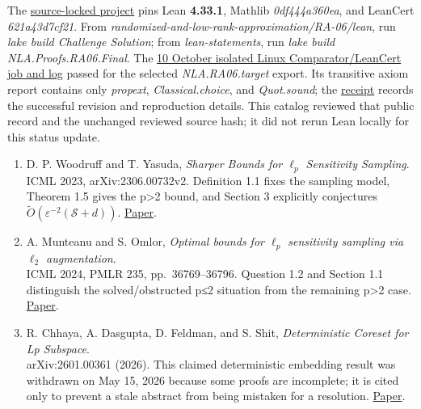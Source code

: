 \documentclass[11pt,a4paper]{article}
\makeatletter
\providecommand{\tightlist}{\setlength{\itemsep}{0pt}\setlength{\parskip}{0pt}}
\renewcommand{\subsection}{\Needspace{4\baselineskip}\@startsection{subsection}{2}{0pt}{9pt plus 1pt minus 1pt}{3pt}{\sffamily\bfseries\normalsize\color{ink}}}
\makeatother
\begin{document}
The
\href{https://github.com/ajt60gaibb/OpenProblemsInNLA/blob/main/randomized-and-low-rank-approximation/RA-06/lean/lake-manifest.json}{source-locked
project} pins Lean \textbf{4.33.1}, Mathlib \textit{0df444a360ea}, and
LeanCert \textit{621a43d7cf21}. From
\textit{randomized-and-low-rank-approximation/RA-06/lean}, run
\textit{lake build Challenge Solution}; from
\textit{lean-statements}, run
\textit{lake build NLA.Proofs.RA06.Final}. The
\href{https://github.com/ajt60gaibb/OpenProblemsInNLA/actions/runs/38006337671/job/114076127303}{10
October isolated Linux Comparator/LeanCert job and log} passed for the
selected \textit{NLA.RA06.target} export. Its transitive axiom report
contains only \textit{propext}, \textit{Classical.choice}, and
\textit{Quot.sound}; the
\href{https://github.com/ajt60gaibb/OpenProblemsInNLA/blob/main/docs/lean/proofs/RA-06/LINUX_CI_RECEIPT.md}{receipt}
records the successful revision and reproduction details. This catalog
reviewed that public record and the unchanged reviewed source hash; it
did not rerun Lean locally for this status update.

\newpage
\subsection{References}\label{references}

\begin{enumerate}
\def\labelenumi{\arabic{enumi}.}
\tightlist
\item
  D. P. Woodruff and T. Yasuda, \emph{Sharper Bounds for \(\ell_p\)
  Sensitivity Sampling}.\\
  ICML 2023, arXiv:2306.00732v2. Definition 1.1 fixes the sampling
  model, Theorem 1.5 gives the p\textgreater2 bound, and Section 3
  explicitly conjectures
  \(\widetilde O(\varepsilon^{-2}(\mathcal S+d))\).
  \href{https://arxiv.org/html/2306.00732v2}{Paper}.
\item
  A. Munteanu and S. Omlor, \emph{Optimal bounds for \(\ell_p\)
  sensitivity sampling via \(\ell_2\) augmentation}.\\
  ICML 2024, PMLR 235, pp.~36769--36796. Question 1.2 and Section 1.1
  distinguish the solved/obstructed p≤2 situation from the remaining
  p\textgreater2 case. \href{https://arxiv.org/abs/2406.00328}{Paper}.
\item
  R. Chhaya, A. Dasgupta, D. Feldman, and S. Shit, \emph{Deterministic
  Coreset for Lp Subspace}.\\
  arXiv:2601.00361 (2026). This claimed deterministic embedding result
  was withdrawn on May 15, 2026 because some proofs are incomplete; it
  is cited only to prevent a stale abstract from being mistaken for a
  resolution. \href{https://arxiv.org/abs/2601.00361}{Paper}.
\end{enumerate}
\end{document}
